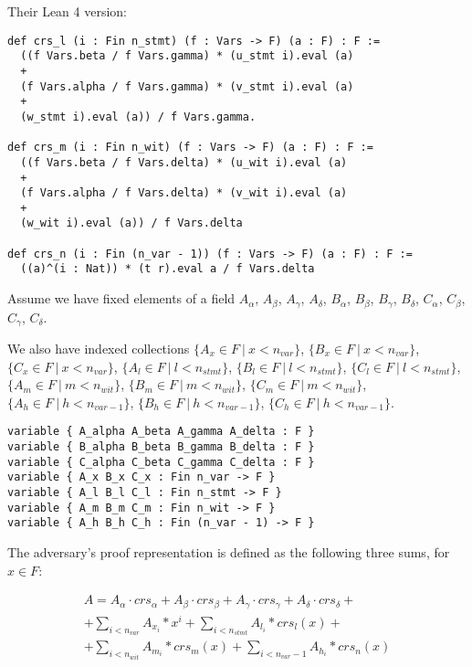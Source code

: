 \documentclass{article}
\theoremstyle{definition}
\theoremstyle{remark}
\begin{document}
Their Lean 4 version:

\begin{lstlisting}
def crs_l (i : Fin n_stmt) (f : Vars -> F) (a : F) : F :=
  ((f Vars.beta / f Vars.gamma) * (u_stmt i).eval (a)
  +
  (f Vars.alpha / f Vars.gamma) * (v_stmt i).eval (a)
  +
  (w_stmt i).eval (a)) / f Vars.gamma.

def crs_m (i : Fin n_wit) (f : Vars -> F) (a : F) : F :=
  ((f Vars.beta / f Vars.delta) * (u_wit i).eval (a)
  +
  (f Vars.alpha / f Vars.delta) * (v_wit i).eval (a)
  +
  (w_wit i).eval (a)) / f Vars.delta

def crs_n (i : Fin (n_var - 1)) (f : Vars -> F) (a : F) : F :=
  ((a)^(i : Nat)) * (t r).eval a / f Vars.delta
\end{lstlisting}

Assume we have fixed elements of a field $A_{\alpha}$, $A_{\beta}$, $A_{\gamma}$, $A_{\delta}$, $B_{\alpha}$, $B_{\beta}$, $B_{\gamma}$, $B_{\delta}$, $C_{\alpha}$, $C_{\beta}$, $C_{\gamma}$, $C_{\delta}$.

We also have indexed collections $\{ A_x \in F \: | \: x < n_{var} \}$, $\{ B_x \in F \: | \: x < n_{var} \}$, $\{ C_x \in F \: | \: x < n_{var} \}$, $\{ A_l \in F \: | \: l < n_{stmt} \}$, $\{ B_l \in F \: | \: l < n_{stmt} \}$, $\{ C_l \in F \: | \: l < n_{stmt} \}$, $\{ A_m \in F \: | \: m < n_{wit} \}$, $\{ B_m \in F \: | \: m < n_{wit} \}$, $\{ C_m \in F \: | \: m < n_{wit} \}$, $\{ A_h \in F \: | \: h < n_{var - 1} \}$, $\{ B_h \in F \: | \: h < n_{var - 1} \}$, $\{ C_h \in F \: | \: h < n_{var - 1} \}$.

\begin{lstlisting}
variable { A_alpha A_beta A_gamma A_delta : F }
variable { B_alpha B_beta B_gamma B_delta : F }
variable { C_alpha C_beta C_gamma C_delta : F }
variable { A_x B_x C_x : Fin n_var -> F }
variable { A_l B_l C_l : Fin n_stmt -> F }
variable { A_m B_m C_m : Fin n_wit -> F }
variable { A_h B_h C_h : Fin (n_var - 1) -> F }
\end{lstlisting}

The adversary's proof representation is defined as the following three sums, for $x \in F$:

\begin{multline}
A = A_{\alpha} \cdot crs_{\alpha} + A_{\beta} \cdot crs_{\beta} + A_{\gamma} \cdot crs_{\gamma} + A_{\delta} \cdot crs_{\delta} + \\
    + \sum \limits_{i < n_{var}} A_{x_i} * x^i + \sum \limits_{i < n_{stmt}} A_{l_i} * crs_l(x) + \\
    + \sum \limits_{i < n_{wit}} A_{m_i} * crs_m(x) + \sum \limits_{i < n_{var} - 1} A_{h_i} * crs_n(x)
\end{multline}
\end{document}
